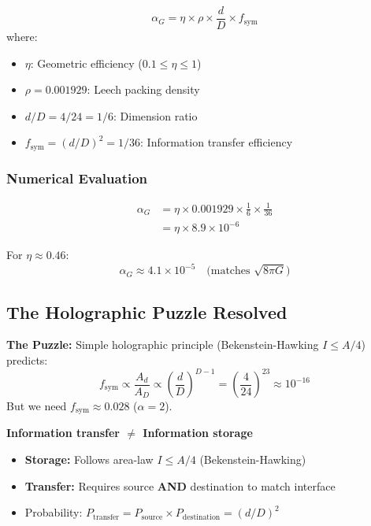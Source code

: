 \documentclass[11pt,titlepage]{article}
\begin{document}
\begin{tcolorbox}[colback=blue!5!white,colframe=blue!75!black,title=Theorem (Gravitational Coupling)]
\[
\alpha_G = \eta \times \rho \times \frac{d}{D} \times f_{\mathrm{sym}}
\]
where:
\begin{itemize}
\item $\eta$: Geometric efficiency ($0.1 \leq \eta \leq 1$)
\item $\rho = 0.001929$: Leech packing density
\item $d/D = 4/24 = 1/6$: Dimension ratio
\item $f_{\mathrm{sym}} = (d/D)^2 = 1/36$: Information transfer efficiency
\end{itemize}
\end{tcolorbox}

\subsubsection{Numerical Evaluation}
\begin{align*}
\alpha_G &= \eta \times 0.001929 \times \frac{1}{6} \times \frac{1}{36} \\
&= \eta \times 8.9\times10^{-6}
\end{align*}

For $\eta \approx 0.46$:
\[
\alpha_G \approx 4.1\times10^{-5} \quad \text{(matches $\sqrt{8\pi G}$)}
\]

\subsection{The Holographic Puzzle Resolved}

\textbf{The Puzzle:} Simple holographic principle (Bekenstein-Hawking $I \leq A/4$) predicts:
\[
f_{\mathrm{sym}} \propto \frac{A_d}{A_D} \propto \left(\frac{d}{D}\right)^{D-1} = \left(\frac{4}{24}\right)^{23} \approx 10^{-16}
\]
But we need $f_{\mathrm{sym}} \approx 0.028$ ($\alpha=2$).

\begin{tcolorbox}[colback=green!5!white,colframe=green!75!black,title=Key Insight (v7.0)]
\textbf{Information transfer $\neq$ Information storage}

\begin{itemize}
\item \textbf{Storage:} Follows area-law $I \leq A/4$ (Bekenstein-Hawking)
\item \textbf{Transfer:} Requires source \textbf{AND} destination to match interface
\item Probability: $P_{\mathrm{transfer}} = P_{\mathrm{source}} \times P_{\mathrm{destination}} = (d/D)^2$
\end{itemize}
\end{tcolorbox}
\end{document}
